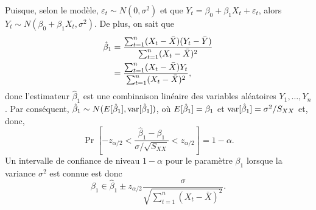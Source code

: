 \begin{solution}{2.11}
    Puisque, selon le modèle, $\varepsilon_t \sim N(0, \sigma^2)$ et
    que $Y_t = \beta_0 + \beta_1 X_t + \varepsilon_t$, alors $Y_t \sim
    N(\beta_0 + \beta_1 X_t, \sigma^2)$. De plus, on sait que
    \begin{align*}
      \hat{\beta}_1
      &= \frac{\sum_{t=1}^n (X_t - \bar{X})(Y_t - \bar{Y})}{%
        \sum_{t=1}^n (X_t - \bar{X})^2} \\
      &= \frac{\sum_{t=1}^n (X_t - \bar{X}) Y_t}{%
        \sum_{t=1}^n (X_t - \bar{X})^2},
    \end{align*}
    donc l'estimateur $\hat{\beta}_1$ est une combinaison linéaire des
    variables aléatoires $Y_1, \dots, Y_n$. Par conséquent,
    $\hat{\beta}_1 \sim N(E [ \hat{\beta}_1 ], \mathrm{var} [ \hat{\beta}_1 ])$,
    où $E [ \hat{\beta}_1 ] = \beta_1$ et $\mathrm{var} [ \hat{\beta}_1 ] =
    \sigma^2/S_{XX}$ et, donc,
    \begin{displaymath}
      \Pr
      \left[
        -z_{\alpha/2} <
        \frac{\hat{\beta}_1 - \beta_1}{\sigma/\sqrt{S_{XX}}} <
        z_{\alpha/2}
      \right] = 1 - \alpha.
    \end{displaymath}
    Un intervalle de confiance de niveau $1 - \alpha$ pour le
    paramètre $\beta_1$ lorsque la variance $\sigma^2$ est connue est donc
    \begin{displaymath}
      \beta_1 \in \hat{\beta}_1 \pm z_{\alpha/2}
      \frac{\sigma}{\sqrt{\sum_{t=1}^n (X_t - \bar{X})^2}}.
    \end{displaymath}
  
\end{solution}
